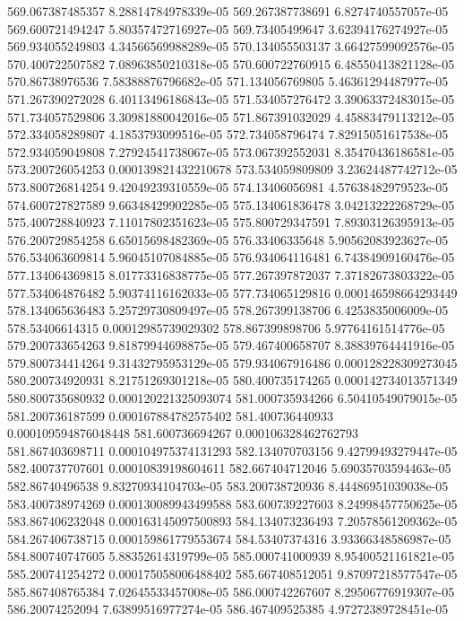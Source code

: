 {569.067387485357 8.28814784978339e-05
569.267387738691 6.8274740557057e-05
569.600721494247 5.80357472716927e-05
569.73405499647 3.62394176274927e-05
569.934055249803 4.34566569988289e-05
570.134055503137 3.66427599092576e-05
570.400722507582 7.08963850210318e-05
570.600722760915 6.48550413821128e-05
570.86738976536 7.58388876796682e-05
571.134056769805 5.46361294487977e-05
571.267390272028 6.40113496186843e-05
571.534057276472 3.39063372483015e-05
571.734057529806 3.30981880042016e-05
571.867391032029 4.45883479113212e-05
572.334058289807 4.1853793099516e-05
572.734058796474 7.82915051617538e-05
572.934059049808 7.27924541738067e-05
573.067392552031 8.35470436186581e-05
573.200726054253 0.000139821432210678
573.534059809809 3.23624487742712e-05
573.800726814254 9.42049239310559e-05
574.13406056981 4.57638482979523e-05
574.600727827589 9.66348429902285e-05
575.134061836478 3.04213222268729e-05
575.400728840923 7.11017802351623e-05
575.800729347591 7.89303126395913e-05
576.200729854258 6.65015698482369e-05
576.33406335648 5.90562083923627e-05
576.534063609814 5.96045107084885e-05
576.934064116481 6.74384909160476e-05
577.134064369815 8.01773316838775e-05
577.267397872037 7.37182673803322e-05
577.534064876482 5.90374116162033e-05
577.734065129816 0.000146598664293449
578.134065636483 5.25729730809497e-05
578.267399138706 6.4253835006009e-05
578.53406614315 0.00012985739029302
578.867399898706 5.97764161514776e-05
579.200733654263 9.81879944698875e-05
579.467400658707 8.38839764441916e-05
579.800734414264 9.31432795953129e-05
579.934067916486 0.000128228309273045
580.200734920931 8.21751269301218e-05
580.400735174265 0.000142734013571349
580.800735680932 0.000120221325093074
581.000735934266 6.50410549079015e-05
581.200736187599 0.000167884782575402
581.400736440933 0.000109594876048448
581.600736694267 0.000106328462762793
581.867403698711 0.000104975374131293
582.134070703156 9.42799493279447e-05
582.400737707601 0.00010839198604611
582.667404712046 5.69035703594463e-05
582.86740496538 9.83270934104703e-05
583.200738720936 8.44486951039038e-05
583.400738974269 0.000130089943499588
583.600739227603 8.24998457750625e-05
583.867406232048 0.000163145097500893
584.134073236493 7.20578561209362e-05
584.267406738715 0.000159861779553674
584.53407374316 3.93366348586987e-05
584.800740747605 5.88352614319799e-05
585.000741000939 8.95400521161821e-05
585.200741254272 0.000175058006488402
585.667408512051 9.87097218577547e-05
585.867408765384 7.02645533457008e-05
586.000742267607 8.29506776919307e-05
586.20074252094 7.63899516977274e-05
586.467409525385 4.97272389728451e-05
}
